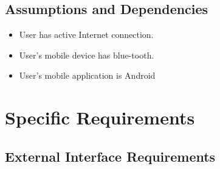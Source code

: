 \documentclass[11pt]{article}
\begin{document}
\subsection{Assumptions and Dependencies}
\begin{itemize}	
	\item User has active Internet connection. 
	\item User's mobile device has blue-tooth.
	\item User's mobile application is Android
	
\end{itemize}
\section{Specific Requirements}
\subsection{External Interface Requirements}
\end{document}
